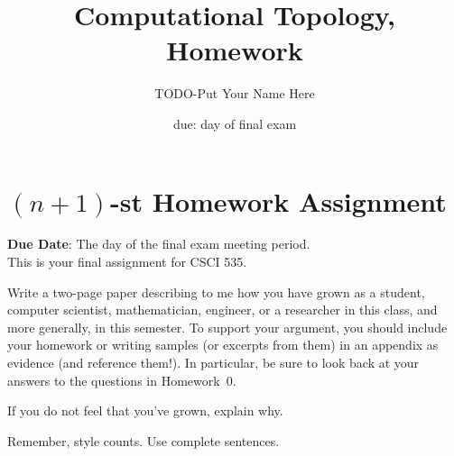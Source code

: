 \documentclass{article}
\title{Computational Topology, Homework \hwnum}
\author{TODO-Put Your Name Here}
\date{due: day of final exam}
\begin{document}
\section*{$(n+1)$-st Homework Assignment}

{\bf{Due Date}}: The day of the final exam meeting period.\\

This is your final assignment for CSCI 535.

Write a two-page paper describing to me how you have grown as a student,
computer scientist, mathematician, engineer, or a researcher in this class, and
more generally, in this semester.  To support your argument, you should include
your homework or writing samples (or excerpts from them) in an appendix as
evidence (and reference them!). In particular, be sure to look back at your
answers to the questions in Homework~$0$.

If you do not feel that you've grown, explain why.

Remember, style counts. Use complete sentences.
\end{document}
